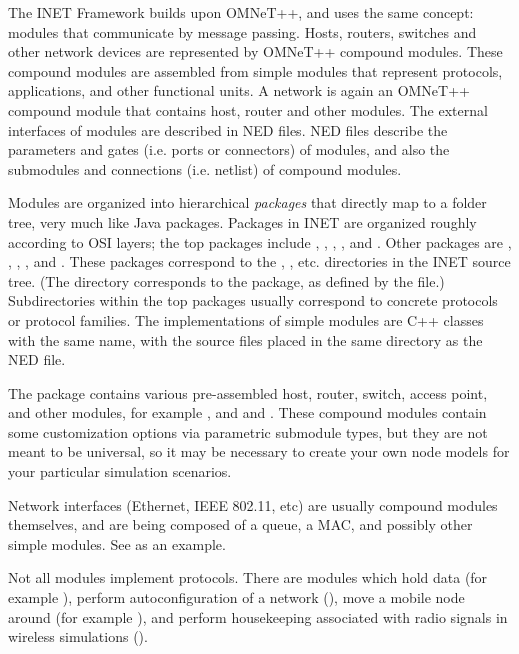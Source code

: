 The INET Framework builds upon OMNeT++, and uses the same concept: modules
that communicate by message passing. Hosts, routers, switches and other
network devices are represented by OMNeT++ compound modules. These compound
modules are assembled from simple modules that represent protocols,
applications, and other functional units. A network is again an OMNeT++
compound module that contains host, router and other modules. The external
interfaces of modules are described in NED files. NED files describe the
parameters and gates (i.e. ports or connectors) of modules, and also the
submodules and connections (i.e. netlist) of compound modules.

Modules are organized into hierarchical \textit{packages} that directly map to
a folder tree, very much like Java packages. Packages in
INET are organized roughly according to OSI layers; the top packages
include , ,
, , and . 
Other packages are , , , 
, and . These packages correspond to the
, , etc. directories in the
INET source tree. (The  directory corresponds to the  
package, as defined by the  file.) Subdirectories
within the top packages usually correspond to concrete protocols or protocol
families. The implementations of simple modules are C++ classes with the same
name, with the source files placed in the same directory as the NED file.

The  package contains various pre-assembled host, router,
switch, access point, and other modules, for example
,  and  and
. These compound modules contain some customization
options via parametric submodule types, but they are not meant to be
universal, so it may be necessary to create your own node models for
your particular simulation scenarios.

Network interfaces (Ethernet, IEEE 802.11, etc) are usually compound modules
themselves, and are being composed of a queue, a MAC, and possibly other
simple modules. See  as an example.

Not all modules implement protocols. There are modules which hold data (for
example ), perform autoconfiguration of a network
(), move a mobile node around (for example
), and perform housekeeping associated with
radio signals in wireless simulations ().

